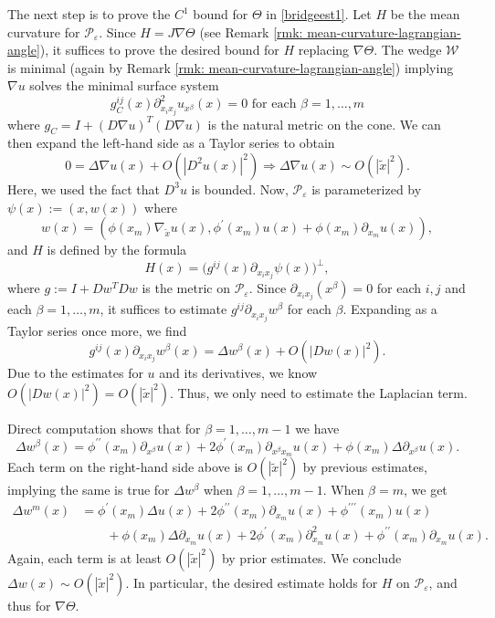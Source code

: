 \documentclass[11pt]{amsart}
\theoremstyle{definition}
\theoremstyle{remark}
\begin{document}
The next step is to prove the $C^1$ bound for $\Theta$ in \ref{bridgeest1}. Let $H$ be the mean curvature for $\mathscr{P}_\varepsilon$. Since $H = J\nabla \Theta$ (see Remark \ref{rmk: mean-curvature-lagrangian-angle}), it suffices to prove the desired bound for $H$ replacing $\nabla \Theta$. The wedge $\mathscr{W}$ is minimal (again by Remark \ref{rmk: mean-curvature-lagrangian-angle}) implying $\nabla u$ solves the minimal surface system \cite[Chapter 11]{GM12}
\[g_{C}^{ij}(x)\partial_{x_ix_j}^2 u_{x^\beta}(x) = 0 \text{ for each } \beta = 1,\ldots, m\]
where $g_{C} = I + (D\nabla u)^T(D\nabla u)$ is the natural metric on the cone. We can then expand the left-hand side as a Taylor series to obtain
\[0 = \Delta \nabla u(x) + O(|D^2u(x)|^2) \Rightarrow \Delta \nabla u(x) \sim O(|\tilde{x}|^2).\]
Here, we used the fact that $D^3u$ is bounded.
Now, $\mathscr{P}_\varepsilon$ is parameterized by $\psi(x) := (x, w(x))$ where
\[w(x) = (\phi(x_m)\nabla_{\tilde{x}}u(x), \phi^\prime(x_m) u(x) + \phi(x_m) \partial_{x_m}u(x)),\]
and $H$ is defined by the formula \cite[eq. (11.7), p. 298]{GM12}
\[H(x) = \big(g^{ij}(x) \partial_{x_i x_j} \psi(x)\big)^{\perp},\]
where $g := I + Dw^T Dw$ is the metric on $\mathscr{P}_\varepsilon$. Since $\partial_{x_i x_j}(x^\beta) = 0$ for each $i,j$ and each $\beta = 1,\ldots, m$, it suffices to estimate $g^{ij}\partial_{x_i x_j} w^\beta$ for each $\beta$. Expanding as a Taylor series once more, we find
\[g^{ij}(x)\partial_{x_i x_j} w^\beta(x) = \Delta w^\beta(x) + O(|Dw(x)|^2).\]
Due to the estimates for $u$ and its derivatives, we know $O(|Dw(x)|^2) = O(|\tilde{x}|^2)$. Thus, we only need to estimate the Laplacian term. 

Direct computation shows that for $\beta = 1,\ldots, m-1$ we have 
\[\Delta w^\beta(x) = \phi^{\prime \prime}(x_m)\partial_{x^\beta}u(x) + 2\phi^\prime(x_m) \partial_{x^\beta x_m}u(x) + \phi(x_m) \Delta \partial_{x^\beta}u(x).\]
Each term on the right-hand side above is $O(|\tilde{x}|^2)$ by previous estimates, implying the same is true for $\Delta w^\beta$ when $\beta = 1,\ldots, m-1$. When $\beta = m$, we get 
\begin{align*}
    \Delta w^m(x) &= \phi^\prime(x_m) \Delta u(x) + 2 \phi^{\prime \prime}(x_m)\partial_{x_m} u(x) + \phi^{\prime \prime \prime}(x_m)u(x) \\
    &\qquad+ \phi(x_m) \Delta \partial_{x_m}u(x) + 2\phi^\prime(x_m) \partial_{x_m}^2 u(x) + \phi^{\prime \prime}(x_m) \partial_{x_m} u(x).
\end{align*}
Again, each term  is at least $O(|\tilde{x}|^2)$ by prior estimates. We conclude $\Delta w(x) \sim O(|\tilde{x}|^2)$. In particular, the desired estimate holds for $H$ on $\mathscr{P}_\varepsilon$, and thus for $\nabla \Theta$. 
\end{document}
